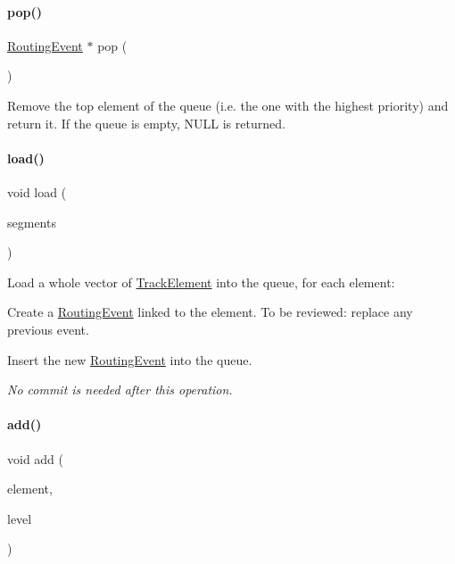\paragraph{\texorpdfstring{pop()}{pop()}}
{\footnotesize\ttfamily \mbox{\hyperlink{classKite_1_1RoutingEvent}{Routing\+Event}} $\ast$ pop (\begin{DoxyParamCaption}{ }\end{DoxyParamCaption})}

Remove the top element of the queue (i.\+e. the one with the highest priority) and return it. If the queue is empty, {\ttfamily N\+U\+LL} is returned. \mbox{\label{classKite_1_1RoutingEventQueue_a7f5a051812b2925dc3c1cca8b2011237}} 
\paragraph{\texorpdfstring{load()}{load()}}
{\footnotesize\ttfamily void load (\begin{DoxyParamCaption}\item[{const vector$<$ \mbox{\hyperlink{classKite_1_1TrackElement}{Track\+Element}} $\ast$$>$ \&}]{segments }\end{DoxyParamCaption})}

Load a whole vector of \mbox{\hyperlink{classKite_1_1TrackElement}{Track\+Element}} into the queue, for each element\+:
\begin{DoxyItemize}
\item Create a \mbox{\hyperlink{classKite_1_1RoutingEvent}{Routing\+Event}} linked to the element. To be reviewed\+: replace any previous event.
\item Insert the new \mbox{\hyperlink{classKite_1_1RoutingEvent}{Routing\+Event}} into the queue.
\end{DoxyItemize}

{\itshape No commit is needed after this operation.} \mbox{\label{classKite_1_1RoutingEventQueue_af0813b67c9fc72d960f7e512e9403d57}} 
\paragraph{\texorpdfstring{add()}{add()}}
{\footnotesize\ttfamily void add (\begin{DoxyParamCaption}\item[{\mbox{\hyperlink{classKite_1_1TrackElement}{Track\+Element}} $\ast$}]{element,  }\item[{unsigned int}]{level }\end{DoxyParamCaption})}

